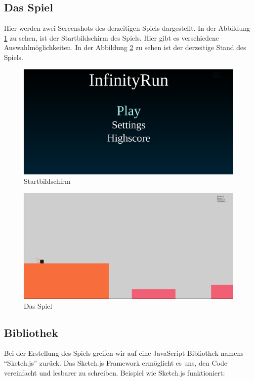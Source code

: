 \subsection{Das Spiel}
Hier werden zwei Screenshots des derzeitigen Spiels dargestellt. In der Abbildung \ref{pic:start} zu sehen, ist der Startbildschirm des Spiels. Hier gibt es verschiedene Auswahlmöglichkeiten. In der Abbildung \ref{pic:spiel} zu sehen ist der derzeitige Stand des Spiels.
\begin{figure}[htb]
	\centering
	\includegraphics[scale=0.22]{content/pictures/start.png}
	\caption{Startbildschirm}
	\label{pic:start}
\end{figure}
\begin{figure}[htb]
	\centering
	\includegraphics[scale=0.22]{content/pictures/spiel.png}
	\caption{Das Spiel}
	\label{pic:spiel}
\end{figure}
\newpage
\subsection{Bibliothek}
Bei der Erstellung des Spiels greifen wir auf eine JavaScript Bibliothek namens ``Sketch.js'' zurück.
Das Sketch.js Framework ermöglicht es uns, den Code vereinfacht und lesbarer zu schreiben. 
Beispiel wie Sketch.js funktioniert:

